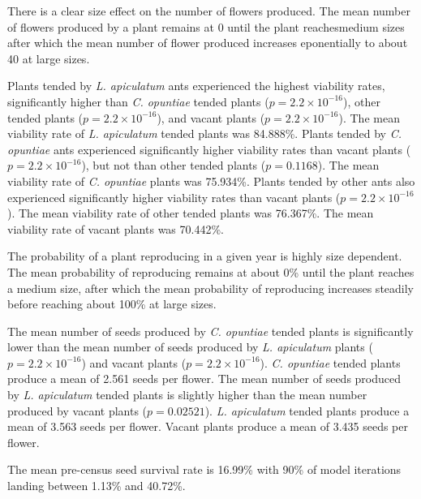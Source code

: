 \documentclass[11pt]{article}
\begin{document}
{{%
There is a clear size effect on the number of flowers produced. 
The mean number of flowers produced by a plant remains at 0 until the plant reachesmedium sizes after which the mean number of flower produced increases eponentially to about 40 at large sizes.


Plants tended by \textit{L. apiculatum} ants experienced the highest viability rates, significantly higher than \textit{C. opuntiae} tended plants ($p = 2.2 \times 10^{-16}$), other tended plants ($p = 2.2 \times 10^{-16}$), and vacant plants ($p = 2.2 \times 10^{-16}$).
The mean viability rate of \textit{L. apiculatum} tended plants was 84.888\%.
Plants tended by \textit{C. opuntiae} ants experienced significantly higher viability rates than vacant plants ($p = 2.2 \times 10^{-16}$), but not than other tended plants ($p = 0.1168$).
The mean viability rate of \textit{C. opuntiae} plants was 75.934\%.
Plants tended by other ants also experienced significantly higher viability rates than vacant plants ($p = 2.2 \times 10^{-16}$).
The mean viability rate of other tended plants was 76.367\%.
The mean viability rate of vacant plants was 70.442\%.

The probability of a plant reproducing in a given year is highly size dependent. 
The mean probability of reproducing remains at about 0\% until the plant reaches a medium size, after which the mean probability of reproducing increases steadily before reaching about 100\% at large sizes. 

The mean number of seeds produced by \textit{C. opuntiae} tended plants is significantly lower than the mean number of seeds produced by \textit{L. apiculatum} plants ($p = 2.2 \times 10^{-16}$) and vacant plants ($p = 2.2 \times 10^{-16}$). 
\textit{C. opuntiae} tended plants produce a mean of 2.561 seeds per flower. 
The mean number of seeds produced by \textit{L. apiculatum} tended plants is slightly higher than the mean number produced by vacant plants ($p = 0.02521$). 
\textit{L. apiculatum} tended plants produce a mean of 3.563 seeds per flower. 
Vacant plants produce a mean of 3.435 seeds per flower. 

The mean pre-census seed survival rate is 16.99\% with 90\% of model iterations landing between 1.13\% and 40.72\%. 

}}
\end{document}
